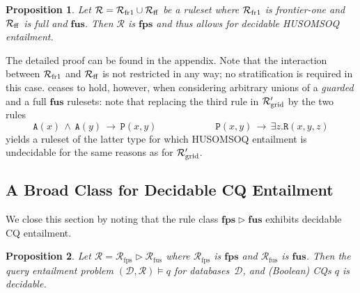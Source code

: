 \documentclass[10pt,a4paper]{amsart}
\theoremstyle{definition}
\numberwithin{equation}{section}
\theoremstyle{plain}
\newtheorem{proposition}[proposition]{Proposition}
\theoremstyle{definition}
\theoremstyle{myexample}
\theoremstyle{plain}
\theoremstyle{definition}
\newcommand{\database}{\mathcal{D}}
\newcommand{\db}{\database}
\newcommand{\cut}{\triangleright}
\newcommand{\ruleset}{\calr}
\newcommand{\fus}{\mathbf{fus}}
\newcommand{\fps}{\mathbf{fps}} %
\newcommand{\hcs}{\fps}
\newcommand{\fhcs}{\hcs}
\newcommand{\calr}{\mathcal{R}}
\newcommand{\pred}[1]{\mathtt{#1}}
\newcommand{\query}{q}
\begin{document}
\begin{proposition}\label{prop:frone-fusddl}
	Let $\ruleset = \ruleset_{\smash{\mathrm{fr1}}} \cup \ruleset_{\smash{\mathrm{ff}}}$ be a ruleset where $\ruleset_{\smash{\mathrm{fr1}}}$ is frontier-one and $\ruleset_{\smash{\mathrm{ff}}}$ is full and $\fus$. Then $\ruleset$ is $\fhcs$ and thus allows for decidable HUSOMSOQ entailment.  
\end{proposition}
%
The detailed proof can be found in the appendix. Note that the interaction between $\ruleset_{\smash{\mathrm{fr1}}}$ and $\ruleset_{\smash{\mathrm{ff}}}$ is not restricted in any way; no stratification is required in this case.
%
 ceases to hold, however, when considering arbitrary unions of a \emph{guarded} and a full $\fus$ rulesets: note that replacing the third rule in $\ruleset'_{\smash{\mathrm{grid}}}$ 
by the two rules 
$$ 
\pred{A}(x) {\,\wedge\,} \pred{A}(y) {\,\to\,} \pred{P}(x,\!y)
\qquad\qquad\qquad 
\pred{P}(x,\!y) {\,\to\,} \exists z. \pred{R}(x,\!y,\!z)
$$%
yields a ruleset of the latter type for which HUSOMSOQ entailment is undecidable for the same reasons as for $\ruleset'_{\smash{\mathrm{grid}}}$. 


\subsection{A Broad Class for Decidable CQ Entailment}
%
We close this section by noting that the rule class $\fhcs \cut \fus$ exhibits decidable CQ entailment.

\begin{proposition}\label{thm:fcs-fus-decidable}
	Let $\ruleset = \ruleset_\mathrm{fps} \cut \ruleset_\mathrm{fus}$ where $\ruleset_\mathrm{fps}$ is $\fhcs$ and $\ruleset_\mathrm{fus}$ is $\fus$. Then the query entailment problem $(\db,\ruleset) \models \query$ for databases~$\db$, and (Boolean) CQs $\query$ is decidable.
\end{proposition}
\end{document}
